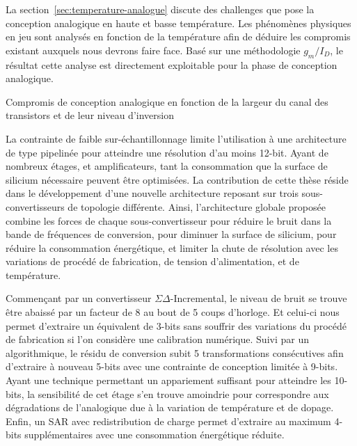 \begin{mdframed}[linecolor=Prune,linewidth=1]
    La section~\ref{sec:temperature-analogue} discute des challenges que pose la conception analogique en haute et basse température. Les phénomènes physiques en jeu sont analysés en fonction de la température afin de déduire les compromis existant auxquels nous devrons faire face. Basé sur une méthodologie \(g_m/I_D\), le résultat cette analyse est directement exploitable pour la phase de conception analogique.
    
    \begin{center}
        \centering
        \resizebox{\textwidth}{!}{
            
        }
        \caption[]{Compromis de conception analogique en fonction de la largeur du canal des transistors et de leur niveau d'inversion}
        \label{fig:tradeoffs-fr}
    \end{center}
    
    La contrainte de faible sur-échantillonnage limite l'utilisation à une architecture de type pipelinée pour atteindre une résolution d'au moins 12-bit. Ayant de nombreux étages, et amplificateurs, tant la consommation que la surface de silicium nécessaire peuvent être optimisées. La contribution de cette thèse réside dans le développement d'une nouvelle architecture reposant sur trois sous-convertisseurs de topologie différente. Ainsi, l'architecture globale proposée combine les forces de chaque sous-convertisseur pour réduire le bruit dans la bande de fréquences de conversion, pour diminuer la surface de silicium, pour réduire la consommation énergétique, et limiter la chute de résolution avec les variations de procédé de fabrication, de tension d'alimentation, et de température.
    
    Commençant par un convertisseur $\Sigma\Delta$-Incremental, le niveau de bruit se trouve être abaissé par un facteur de 8 au bout de 5 coups d'horloge. Et celui-ci nous permet d'extraire un équivalent de 3-bits sans souffrir des variations du procédé de fabrication si l'on considère une calibration numérique. Suivi par un algorithmique, le résidu de conversion subit 5 transformations consécutives afin d'extraire à nouveau 5-bits avec une contrainte de conception limitée à 9-bits. Ayant une technique permettant un appariement suffisant pour atteindre les 10-bits, la sensibilité de cet étage s'en trouve amoindrie pour correspondre aux dégradations de l'analogique due à la variation de température et de dopage. Enfin, un SAR avec redistribution de charge permet d'extraire au maximum 4-bits supplémentaires avec une consommation énergétique réduite.
    

\end{mdframed}
